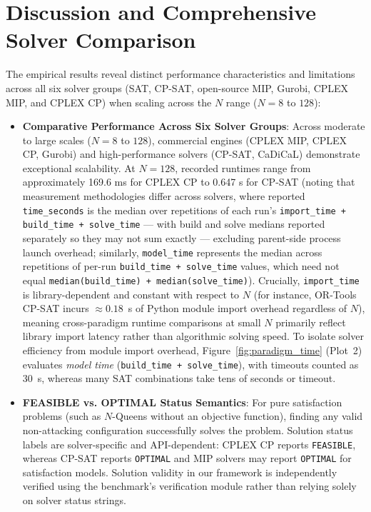 \documentclass[a4paper,fleqn]{cas-sc}
\begin{document}
\section{Discussion and Comprehensive Solver Comparison}
The empirical results reveal distinct performance characteristics and limitations across all six solver groups (SAT, CP-SAT, open-source MIP, Gurobi, CPLEX MIP, and CPLEX CP) when scaling across the $N$ range ($N = 8$ to $128$):
\begin{itemize}
    \item \textbf{Comparative Performance Across Six Solver Groups}: Across moderate to large scales ($N = 8$ to $128$), commercial engines (CPLEX MIP, CPLEX CP, Gurobi) and high-performance solvers (CP-SAT, CaDiCaL) demonstrate exceptional scalability. At $N = 128$, recorded runtimes range from approximately 169.6 ms for CPLEX CP to 0.647 s for CP-SAT (noting that measurement methodologies differ across solvers, where reported \texttt{time\_seconds} is the median over repetitions of each run's \texttt{import\_time + build\_time + solve\_time} — with build and solve medians reported separately so they may not sum exactly — excluding parent-side process launch overhead; similarly, \texttt{model\_time} represents the median across repetitions of per-run \texttt{build\_time + solve\_time} values, which need not equal \texttt{median(build\_time) + median(solve\_time)}). Crucially, \texttt{import\_time} is library-dependent and constant with respect to $N$ (for instance, OR-Tools CP-SAT incurs $\approx 0.18$~s of Python module import overhead regardless of $N$), meaning cross-paradigm runtime comparisons at small $N$ primarily reflect library import latency rather than algorithmic solving speed. To isolate solver efficiency from module import overhead, Figure~\ref{fig:paradigm_time} (Plot~2) evaluates \emph{model time} (\texttt{build\_time + solve\_time}), with timeouts counted as 30~s, whereas many SAT combinations take tens of seconds or timeout.
    \item \textbf{FEASIBLE vs. OPTIMAL Status Semantics}: For pure satisfaction problems (such as $N$-Queens without an objective function), finding any valid non-attacking configuration successfully solves the problem. Solution status labels are solver-specific and API-dependent: CPLEX CP reports \texttt{FEASIBLE}, whereas CP-SAT reports \texttt{OPTIMAL} and MIP solvers may report \texttt{OPTIMAL} for satisfaction models. Solution validity in our framework is independently verified using the benchmark's verification module rather than relying solely on solver status strings.

\end{itemize}
\end{document}
